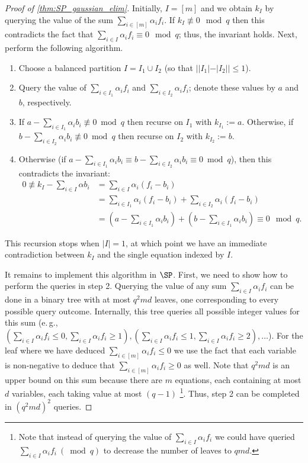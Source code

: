 \documentclass[11pt]{article}
\newcommand{\eg}{e.\,g.}
\begin{document}
\begin{proof}[Proof of \autoref{thm:SP_gaussian_elim}]
	Initially, $I = [m]$ and we obtain $k_I$ by querying the value of the sum $\sum_{i \in [m]} \alpha_i f_i$. If $k_I \not \equiv 0 \mod q$ then this contradicts the fact that $\sum_{i \in I} \alpha_i f_i \equiv 0 \mod q$; thus, the invariant holds.  Next, perform the following algorithm.
	\begin{enumerate}
		\item Choose a balanced partition $I = I_1 \cup I_2$ (so that $||I_1|-|I_2|| \leq 1$).
		\item Query the value of $\sum_{i \in I_1} \alpha_i f_i$ and $ \sum_{i \in I_2} \alpha_i f_i$; denote these values by $a$ and $b$, respectively.
		\item If $a -\sum_{i \in I_1} \alpha_i b_i \not \equiv 0 \bmod q$ then recurse on $I_1$ with $k_{I_1} := a$. Otherwise, if $b -\sum_{i \in I_2} \alpha_i b_i \not \equiv 0 \bmod q$ then recurse on $I_2$ with $k_{I_2} := b$.
		\item Otherwise (if $a -\sum_{i \in I_1} \alpha_i b_i \equiv b -\sum_{i \in I_2} \alpha_i b_i \equiv 0 \bmod q$), then this contradicts the invariant:
			\begin{align*} 0  \not \equiv k_I - \sum_{i \in I} \alpha b_i
			&= \sum_{i \in I} \alpha_i (f_i-b_i) \\ &= \sum_{i \in I_1} \alpha_i (f_i-b_i) + \sum_{i \in I_2} \alpha_i (f_i-b_i) \\ 
			&= (a-\sum_{i\in I_1} \alpha_ib_i) + (b-\sum_{i\in I_1} \alpha_ib_i) \equiv 0 \mod q.	
			\end{align*}
	\end{enumerate}
	This recursion stops when $|I| = 1$, at which point we have an immediate contradiction between $k_I$ and the single equation indexed by $I$. 
	
	It remains to implement this algorithm in $\SP$. First, we need to show how to perform the queries in step 2. 
	Querying the value of any sum $\sum_{i \in I} \alpha_i f_i$ can be done in a binary tree with at most $q^2md$ leaves, one corresponding to every possible query outcome. Internally, this tree queries all possible integer values for this sum (\eg,  $(\sum_{i \in I} \alpha_i f_i \leq 0, \sum_{i \in I} \alpha_i f_i \geq 1), (\sum_{i \in I} \alpha_i f_i \leq 1, \sum_{i \in I} \alpha_i f_i \geq 2), \ldots$). For the leaf where we have deduced $\sum_{i \in [m]} \alpha_i f_i \leq 0$ we use the fact that each variable is non-negative to deduce that $\sum_{i \in [m]} \alpha_i f_i \geq 0$ as well. 
	Note that $q^2md$ is an upper bound on this sum because there are $m$ equations, each containing at most $d$ variables, each taking value at most $(q-1)$ \footnote{Note that instead of querying the value of $\sum_{i \in I} \alpha_i f_i$ we could have queried $\sum_{i \in I} \alpha_i f_i ~(\bmod q)$ to decrease the number of leaves to $qmd$.}. Thus, step 2 can be completed in $(q^2md)^2$ queries.
	

\end{proof}
\end{document}
